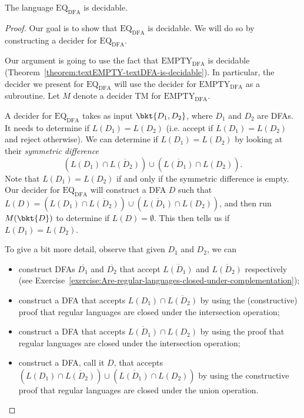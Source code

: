 \begin{theorem}
\label{theorem:textEQ-textDFA-is-decidable}
The language $\mathrm{EQ}_\mathrm{DFA}$ is decidable.

\end{theorem}

\begin{proof}
\label{prf:Turing-Machines::empty}
Our goal is to show that $\mathrm{EQ}_\mathrm{DFA}$ is decidable. We will do so by constructing a decider for $\mathrm{EQ}_\mathrm{DFA}$. 

Our argument is going to use the fact that $\mathrm{EMPTY}_\mathrm{DFA}$ is decidable (Theorem~\ref{theorem:textEMPTY-textDFA-is-decidable}). In particular, the decider we present for $\mathrm{EQ}_\mathrm{DFA}$ will use the decider for $\mathrm{EMPTY}_\mathrm{DFA}$ as a subroutine. Let $M$ denote a decider TM for $\mathrm{EMPTY}_\mathrm{DFA}$.

A decider for $\mathrm{EQ}_\mathrm{DFA}$ takes as input $\bkt{D_1,D_2}$, where $D_1$ and $D_2$ are DFAs. It needs to determine if $L(D_1) = L(D_2)$ (i.e. accept if $L(D_1) = L(D_2)$ and reject otherwise). We can determine if $L(D_1) = L(D_2)$ by looking at their \emph{symmetric difference}
\[
(L(D_1) \cap \overline{L(D_2)}) \cup (\overline{L(D_1)} \cap L(D_2)).
\]
Note that $L(D_1) = L(D_2)$ if and only if the symmetric difference is empty. Our decider for $\mathrm{EQ}_\mathrm{DFA}$ will construct a DFA $D$ such that $L(D) = (L(D_1) \cap \overline{L(D_2)}) \cup (\overline{L(D_1)} \cap L(D_2))$, and then run $M(\bkt{D})$ to determine if $L(D) = \emptyset$. This then tells us if $L(D_1) = L(D_2)$. 

To give a bit more detail, observe that given $D_1$ and $D_2$, we can 
\begin{itemize}
    \item construct DFAs $\overline{D_1}$ and $\overline{D_2}$ that accept $\overline{L(D_1)}$ and $\overline{L(D_2)}$ respectively (see Exercise~\ref{exercise:Are-regular-languages-closed-under-complementation});
    \item construct a DFA that accepts $L(D_1) \cap \overline{L(D_2)}$ by using the (constructive) proof that regular languages are closed under the intersection operation;
    \item construct a DFA that accepts $\overline{L(D_1)} \cap L(D_2)$ by using the proof that regular languages are closed under the intersection operation;
    \item construct a DFA, call it $D$, that accepts $(L(D_1) \cap \overline{L(D_2)}) \cup (\overline{L(D_1)} \cap L(D_2))$ by using the constructive proof that regular languages are closed under the union operation.
\end{itemize} 


\end{proof}
